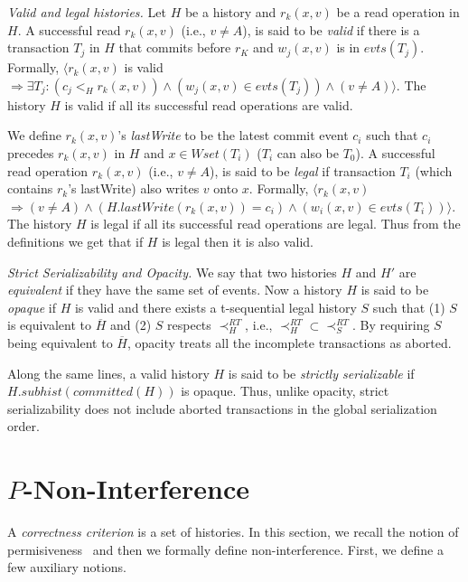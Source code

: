 \documentclass{llncs}
\newcommand{\Wset}{\textit{Wset}}
\newcommand{\op} {operation}
\newcommand{\nonin} {non-interference}
\newcommand{\perm} {permisiveness}
\newcommand{\comm}{\textit{committed}}
\newcommand{\evts}[1] {evts(#1)}
\newcommand{\lastw} {lastWrite}
\newcommand{\lwrite}[2] {#2.lastWrite(#1)}
\newcommand{\valid} {valid}
\newcommand{\svvalid} {legal}
\newcommand{\shist}[2]  {#2.subhist(#1)}
\begin{document}
\vspace{1mm}
\noindent
\textit{Valid and legal histories.} 
Let $H$ be a history and $r_k(x, v)$ be a read {\op} in $H$. A
successful read $r_k(x, v)$ (i.e., $v \neq A$), is said to be
\emph{\valid} if there is a transaction $T_j$ in $H$ that commits
before $r_K$ and $w_j(x, v)$ is in $\evts{T_j}$. Formally, $\langle
r_k(x, v)$  is \valid{} 
$\Rightarrow \exists T_j: (c_j <_{H} r_k(x, v)) \land (w_j(x, v) \in
\evts{T_j}) \land (v \neq A) \rangle$.  The history $H$ is \valid{} 
if all its successful read \op{s} are \valid. 

We define $r_k(x, v)$'s \textit{\lastw{}} to be the latest commit event
$c_i$ such that $c_i$ precedes $r_k(x, v)$ in $H$ and $x\in\Wset(T_i)$
($T_i$ can also be $T_0$). A successful read \op{} $r_k(x, v)$ (i.e.,
$v \neq A$), is said to be \emph{\svvalid{}} if transaction $T_i$
(which contains  $r_k$'s \lastw{}) also writes $v$ onto $x$. Formally,
$\langle r_k(x, v)$ \text{is \svvalid{}} $\Rightarrow (v \neq A) \land
(\lwrite{r_k(x, v)}{H} = c_i) \land (w_i(x,v) \in \evts{T_i})
\rangle$.  The history $H$ is \svvalid{} if all its successful read
\op{s} are \svvalid. Thus from the definitions we get that if $H$ is \svvalid{} then it is also \valid.






\vspace{1mm}
\noindent
\textit{Strict Serializability and Opacity.} 
We say that two histories $H$ and $H'$ are \emph{equivalent} if
they have the same set of events.  
Now a history $H$ is said to be \textit{opaque}
\cite{GuerKap:2008:PPoPP,tm-book} 
if $H$ is \valid{}  and there exists a
t-sequential legal history $S$ such that (1) $S$ is equivalent to
$\overline{H}$ and (2) $S$ respects $\prec_{H}^{RT}$, i.e.,
$\prec_{H}^{RT} \subset \prec_{S}^{RT}$. 
By requiring $S$ being equivalent to $\overline{H}$, opacity treats
all the incomplete transactions as aborted. 

Along the same lines, a \valid{} history $H$ is said to be
\textit{strictly serializable} if $\shist{\comm(H)}{H}$ is opaque.
Thus, unlike opacity, strict serializability does not include aborted
transactions in the global serialization order.

\section{$P$-Non-Interference}
\label{sec:ni}
A \textit{correctness criterion} is a set of histories.
In this section, we recall the notion of \perm{}~\cite{Guer+:disc:2008} and 
then we formally define \nonin{}. 
First, we define a few auxiliary notions.
\end{document}
